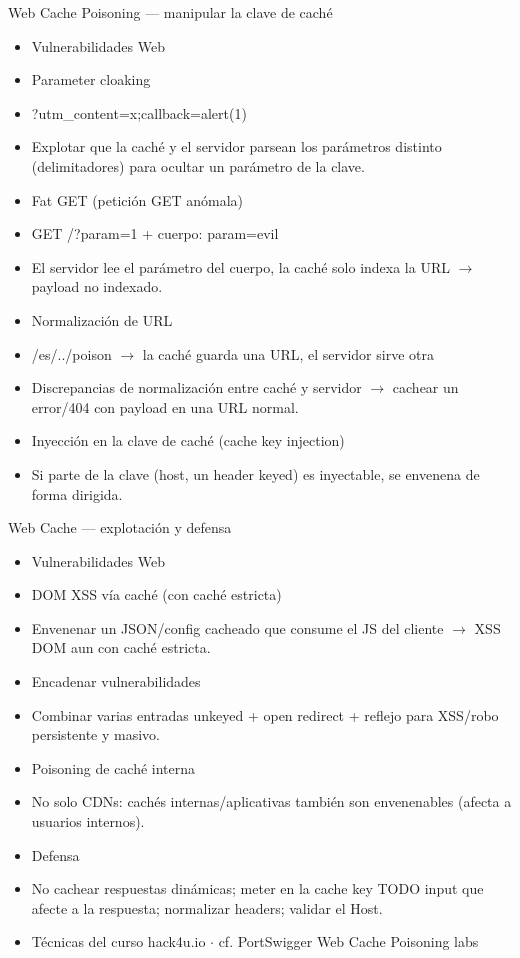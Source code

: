 \documentclass[aspectratio=169,10pt]{beamer}
\begin{document}
\begin{frame}[allowframebreaks]{Web Cache Poisoning --- manipular la clave de caché}
\small
  \begin{itemize}
  \item Vulnerabilidades Web
  \item Parameter cloaking
  \item ?utm\_content=x;callback=alert(1)
  \item Explotar que la caché y el servidor parsean los parámetros distinto (delimitadores) para ocultar un parámetro de la clave.
  \item Fat GET (petición GET anómala)
  \item GET /?param=1 + cuerpo: param=evil
  \item El servidor lee el parámetro del cuerpo, la caché solo indexa la URL $\rightarrow$ payload no indexado.
  \item Normalización de URL
  \item /es/../poison $\rightarrow$ la caché guarda una URL, el servidor sirve otra
  \item Discrepancias de normalización entre caché y servidor $\rightarrow$ cachear un error/404 con payload en una URL normal.
  \item Inyección en la clave de caché (cache key injection)
  \item Si parte de la clave (host, un header keyed) es inyectable, se envenena de forma dirigida.
  \end{itemize}
\end{frame}

\begin{frame}[allowframebreaks]{Web Cache --- explotación y defensa}
\small
  \begin{itemize}
  \item Vulnerabilidades Web
  \item DOM XSS vía caché (con caché estricta)
  \item Envenenar un JSON/config cacheado que consume el JS del cliente $\rightarrow$ XSS DOM aun con caché estricta.
  \item Encadenar vulnerabilidades
  \item Combinar varias entradas unkeyed + open redirect + reflejo para XSS/robo persistente y masivo.
  \item Poisoning de caché interna
  \item No solo CDNs: cachés internas/aplicativas también son envenenables (afecta a usuarios internos).
  \item Defensa
  \item No cachear respuestas dinámicas; meter en la cache key TODO input que afecte a la respuesta; normalizar headers; validar el Host.
  \item Técnicas del curso hack4u.io $\cdot$ cf. PortSwigger Web Cache Poisoning labs
  \end{itemize}
\end{frame}
\end{document}
